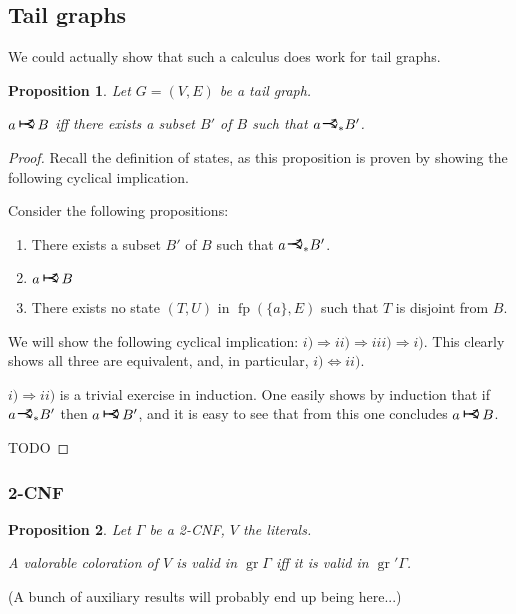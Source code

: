 \documentclass[11pt]{article}
\DeclareMathOperator{\gr}{gr}
\DeclareMathOperator{\fp}{fp}
\newcommand{\rightcurveor}{
\!
\mathrel{
  \begin{tikzpicture}[scale=0.8]
    \draw[thick,->] (0,0) arc (90:150:-2ex);
    \draw[thick,->] (0,0) arc (90:30:2ex);
    \draw[thick] (-1ex, 0) -- (0.1ex,0);
  \end{tikzpicture}
}\!
}
\newcommand{\Rightcurveor}{
\mathrel{
  \begin{tikzpicture}[scale=0.8]
    \draw[thick,->] (0,0) arc (90:150:-2ex);
    \draw[thick,->] (0,0) arc (90:30:2ex);
    \draw[thick] (-1ex, 0) -- (0.1ex,0);
    \draw[thick] (-1ex, -0.7ex) -- (-1ex, 0.7ex);
  \end{tikzpicture}
}
}
\newtheorem{prop}{Proposition}
\begin{document}
\subsection{Tail graphs}

We could actually show that such a calculus does work for tail graphs.

\begin{prop}
Let $G = (V,E)$ be a tail graph.

$a \Rightcurveor B$ iff there exists a subset $B'$ of $B$ such that $a \rightcurveor_* B'$.
\end{prop}

\begin{proof}
Recall the definition of states, as this proposition is proven by showing the following cyclical implication.

Consider the following propositions:

\begin{enumerate}[i]
\item There exists a subset $B'$ of $B$ such that $a \rightcurveor_* B'$.
\item $a \Rightcurveor B$
\item There exists no state $(T,U)$ in $\fp (\{a\}, E)$ such that $T$ is disjoint from $B$.
\end{enumerate}

We will show the following cyclical implication: $i) \Rightarrow ii) \Rightarrow iii) \Rightarrow i)$. This clearly shows all three are equivalent, and, in particular, $i) \Leftrightarrow ii)$.

$i) \Rightarrow ii)$ is a trivial exercise in induction. One easily shows by induction that if $a \rightcurveor_* B'$ then $a \Rightcurveor B'$, and it is easy to see that from this one concludes $a \Rightcurveor B$.

TODO
\end{proof}

\subsubsection{2-CNF}

\begin{prop}
Let $\Gamma$ be a 2-CNF, $V$ the literals.

A valorable coloration of $V$ is valid in $\gr \Gamma$ iff it is valid in $\gr' \Gamma$.
\end{prop}

(A bunch of auxiliary results will probably end up being here...)
\end{document}
